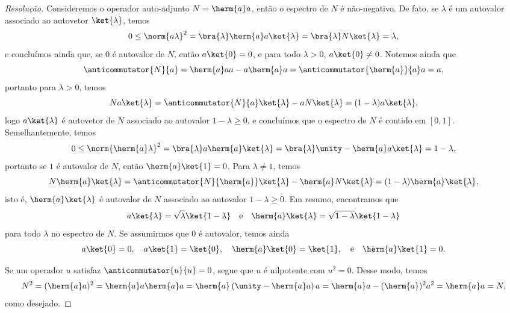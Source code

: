 \begin{proof}[Resolução]
    Consideremos o operador auto-adjunto \(N = \herm{a}a\), então o espectro de \(N\) é não-negativo. De fato, se \(\lambda\) é um autovalor associado ao autovetor \(\ket{\lambda}\), temos
    \begin{equation*}
        0 \leq \norm{a \lambda}^2 = \bra{\lambda}\herm{a}a\ket{\lambda} = \bra{\lambda}N\ket{\lambda} = \lambda,
    \end{equation*}
    e concluímos ainda que, se \(0\) é autovalor de \(N\), então \(a \ket{0} = 0\), e para todo \(\lambda > 0\), \(a\ket{0} \neq 0\). Notemos ainda que
    \begin{equation*}
        \anticommutator{N}{a} = \herm{a}aa - a\herm{a}a = \anticommutator{\herm{a}}{a}a = a,
    \end{equation*}
    portanto para \(\lambda > 0\), temos
    \begin{equation*}
        N a\ket{\lambda} = \anticommutator{N}{a} \ket{\lambda} - a N \ket{\lambda} = (1 - \lambda)a \ket{\lambda},
    \end{equation*}
    logo \(a \ket{\lambda}\) é autovetor de \(N\) associado ao autovalor \(1 - \lambda \geq 0\), e concluímos que o espectro de \(N\) é contido em \([0,1]\). Semelhantemente, temos
    \begin{equation*}
        0 \leq \norm{\herm{a}\lambda}^2 = \bra{\lambda}a\herm{a}\ket{\lambda} = \bra{\lambda}\unity - \herm{a}a\ket{\lambda} = 1 - \lambda,
    \end{equation*}
    portanto se \(1\) é autovalor de \(N\), então \(\herm{a}\ket{1} = 0\). Para \(\lambda\neq 1\), temos
    \begin{equation*}
        N\herm{a}\ket{\lambda} = \anticommutator{N}{\herm{a}}\ket{\lambda} - \herm{a} N \ket{\lambda} = (1 - \lambda)\herm{a}\ket{\lambda},
    \end{equation*}
    isto é, \(\herm{a}\ket{\lambda}\) é autovalor de \(N\) associado ao autovalor \(1 - \lambda \geq 0\). Em resumo, encontramos que
    \begin{equation*}
        a\ket{\lambda} = \sqrt{\lambda} \ket{1-\lambda}\quad\text{e}\quad \herm{a}\ket{\lambda} = \sqrt{1 - \lambda} \ket{1 - \lambda}
    \end{equation*}
    para todo \(\lambda\) no espectro de \(N\). Se assumirmos que \(0\) é autovalor, temos ainda
    \begin{equation*}
        a\ket{0} = 0,\quad a\ket{1} = \ket{0}, \quad \herm{a}\ket{0} = \ket{1},\quad\text{e}\quad \herm{a}\ket{1} = 0.
    \end{equation*}

    Se um operador \(u\) satisfaz \(\anticommutator{u}{u} = 0\), segue que \(u\) é nilpotente com \(u^2 = 0\). Desse modo, temos
    \begin{equation*}
        N^2 = (\herm{a}a)^2 = \herm{a}a\herm{a}a = \herm{a}\left(\unity - \herm{a}a\right)a = \herm{a}a - (\herm{a})^2a^2 = \herm{a}a = N,
    \end{equation*}
    como desejado.
\end{proof}
